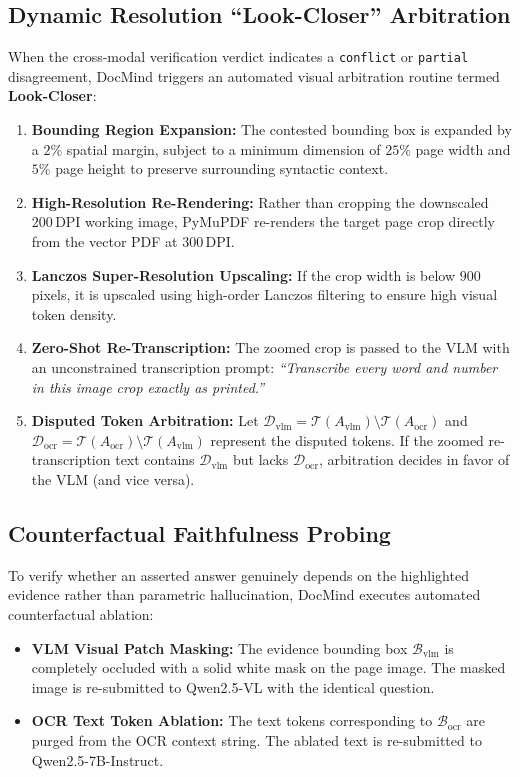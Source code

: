\documentclass[conference]{IEEEtran}
\begin{document}
\subsection{Dynamic Resolution ``Look-Closer'' Arbitration}
When the cross-modal verification verdict indicates a \texttt{conflict} or \texttt{partial} disagreement, DocMind triggers an automated visual arbitration routine termed \textbf{Look-Closer}:
\begin{enumerate}
    \item \textbf{Bounding Region Expansion:} The contested bounding box is expanded by a $2\%$ spatial margin, subject to a minimum dimension of $25\%$ page width and $5\%$ page height to preserve surrounding syntactic context.
    \item \textbf{High-Resolution Re-Rendering:} Rather than cropping the downscaled $200$\,DPI working image, PyMuPDF re-renders the target page crop directly from the vector PDF at $300$\,DPI.
    \item \textbf{Lanczos Super-Resolution Upscaling:} If the crop width is below $900$ pixels, it is upscaled using high-order Lanczos filtering to ensure high visual token density.
    \item \textbf{Zero-Shot Re-Transcription:} The zoomed crop is passed to the VLM with an unconstrained transcription prompt: \textit{``Transcribe every word and number in this image crop exactly as printed.''}
    \item \textbf{Disputed Token Arbitration:} Let $\mathcal{D}_{\text{vlm}} = \mathcal{T}(A_{\text{vlm}}) \setminus \mathcal{T}(A_{\text{ocr}})$ and $\mathcal{D}_{\text{ocr}} = \mathcal{T}(A_{\text{ocr}}) \setminus \mathcal{T}(A_{\text{vlm}})$ represent the disputed tokens. If the zoomed re-transcription text contains $\mathcal{D}_{\text{vlm}}$ but lacks $\mathcal{D}_{\text{ocr}}$, arbitration decides in favor of the VLM (and vice versa).
\end{enumerate}

\subsection{Counterfactual Faithfulness Probing}
To verify whether an asserted answer genuinely depends on the highlighted evidence rather than parametric hallucination, DocMind executes automated counterfactual ablation:
\begin{itemize}
    \item \textbf{VLM Visual Patch Masking:} The evidence bounding box $\mathcal{B}_{\text{vlm}}$ is completely occluded with a solid white mask on the page image. The masked image is re-submitted to Qwen2.5-VL with the identical question.
    \item \textbf{OCR Text Token Ablation:} The text tokens corresponding to $\mathcal{B}_{\text{ocr}}$ are purged from the OCR context string. The ablated text is re-submitted to Qwen2.5-7B-Instruct.
\end{itemize}
\end{document}
